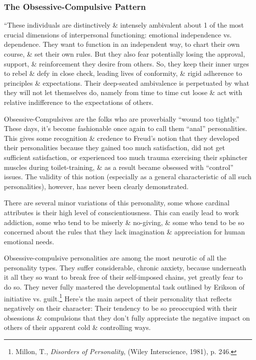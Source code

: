 \documentclass{article}
\numberwithin{equation}{section}
\begin{document}
\subsubsection{The Obsessive-Compulsive Pattern}
``These individuals are distinctively \& intensely ambivalent about 1 of the most crucial dimensions of interpersonal functioning: emotional independence vs. dependence. They want to function in an independent way, to chart their own course, \& set their own rules. But they also fear potentially losing the approval, support, \& reinforcement they desire from others. So, they keep their inner urges to rebel \& defy in close check, leading lives of conformity, \& rigid adherence to principles \& expectations. Their deep-seated ambivalence is perpetuated by what they will not let themselves do, namely from time to time cut loose \& act with relative indifference to the expectations of others.

Obsessive-Compulsives are the folks who are proverbially ``wound too tightly.'' These days, it's become fashionable once again to call them ``anal'' personalities. This gives some recognition \& credence to Freud's notion that they developed their personalities because they gained too much satisfaction, did not get sufficient satisfaction, or experienced too much trauma exercising their sphincter muscles during toilet-training, \& as a result became obsessed with ``control'' issues. The validity of this notion (especially as a general characteristic of all such personalities), however, has never been clearly demonstrated.

There are several minor variations of this personality, some whose cardinal attributes is their high level of conscientiousness. This can easily lead to work addiction, some who tend to be miserly \& no-giving, \& some who tend to be so concerned about the rules that they lack imagination \& appreciation for human emotional needs.

Obsessive-compulsive personalities are among the most neurotic of all the personality types. They suffer considerable, chronic anxiety, because underneath it all they so want to break free of their self-imposed chains, yet greatly fear to do so. They never fully mastered the developmental task outlined by Erikson of initiative vs. guilt.\footnote{Millon, T., \textit{Disorders of Personality}, (Wiley Interscience, 1981), p. 246.} Here's the main aspect of their personality that reflects negatively on their character: Their tendency to be so preoccupied with their obsessions \& compulsions that they don't fully appreciate the negative impact on others of their apparent cold \& controlling ways.
\end{document}
